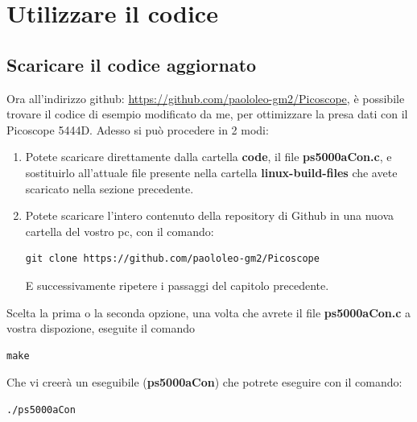 \documentclass[a4paper]{article}
\begin{document}
\section{Utilizzare il codice}
\subsection{Scaricare il codice aggiornato}
Ora all'indirizzo github: \url{https://github.com/paololeo-gm2/Picoscope}, è possibile trovare il codice di esempio modificato da me, per ottimizzare la presa dati con il Picoscope 5444D.
Adesso si può procedere in 2 modi:
\begin{enumerate}
\item Potete scaricare direttamente dalla cartella \textbf{code}, il file \textbf{ps5000aCon.c}, e sostituirlo all'attuale file presente nella cartella \textbf{linux-build-files} che avete scaricato nella sezione precedente.
\item Potete scaricare l'intero contenuto della repository di Github in una nuova cartella del vostro pc, con il comando:
\begin{lstlisting}
git clone https://github.com/paololeo-gm2/Picoscope
\end{lstlisting}
E successivamente ripetere i passaggi del capitolo precedente.
\end{enumerate}
Scelta la prima o la seconda opzione, una volta che avrete il file \textbf{ps5000aCon.c} a vostra dispozione, eseguite il comando
\begin{lstlisting}
make
\end{lstlisting}
Che vi creerà un eseguibile (\textbf{ps5000aCon}) che potrete eseguire con il comando:
\begin{lstlisting}
./ps5000aCon
\end{lstlisting}
\end{document}
